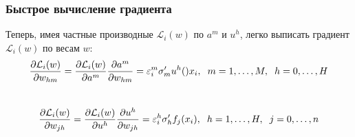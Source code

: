 \documentclass[12pt]{beamer}
\begin{document}
\begin{frame}\frametitle{Быстрое вычисление градиента}
Теперь, имея частные производные $\mathcal{L}_i(w)$ по $a^m$ и $u^h$, легко выписать градиент $\mathcal{L}_i(w)$ по весам $w$:\\

$$\frac {\partial \mathcal{L}_i(w)}{\partial w_{hm}} = \frac {\partial \mathcal{L}_i(w)}{\partial a^m} \frac {\partial a^m}{\partial w_{hm}} = \varepsilon^m_i \sigma'_m u^h()x_i, \hspace{2mm} m = 1,\dots,M, \hspace{2mm} h = 0,\dots, H$$\\

$$\frac {\partial \mathcal{L}_i(w)}{\partial w_{jh}} = \frac {\partial \mathcal{L}_i(w)}{\partial u^h} \frac {\partial u^h}{\partial w_{jh}} = \varepsilon_i^h \sigma'_h f_j(x_i), \hspace{2mm} h = 1,\dots,H, \hspace{2mm} j = 0,\dots, n$$ \\

\end{frame}
\end{document}
